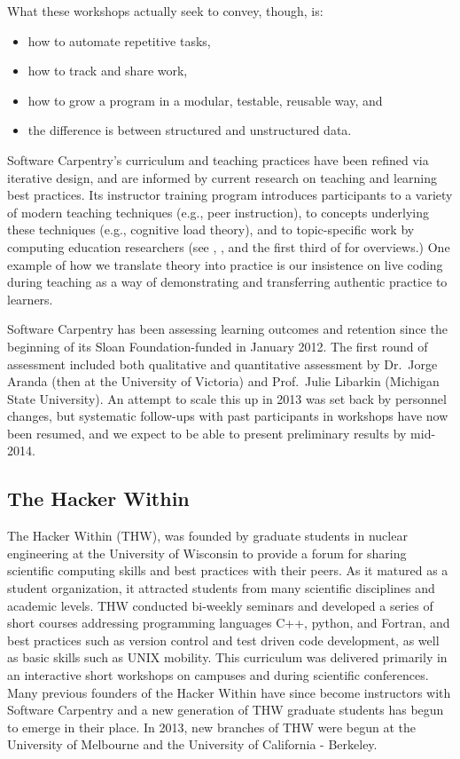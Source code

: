 \documentclass[11pt]{article}
\begin{document}
What these workshops actually seek to convey, though, is:

\begin{itemize}
\item
  how to automate repetitive tasks,
\item
  how to track and share work,
\item
  how to grow a program in a modular, testable, reusable way, and
\item
  the difference is between structured and unstructured data.
\end{itemize}

Software Carpentry's curriculum and teaching practices have been
refined via iterative design, and are informed by current research on
teaching and learning best practices.  Its instructor training program
introduces participants to a variety of modern teaching techniques
(e.g., peer instruction), to concepts underlying these techniques
(e.g., cognitive load theory), and to topic-specific work by computing
education researchers (see \cite{guzdial2010}, \cite{hazzan2011}, and
the first third of \cite{sorva2012} for overviews.)  One example of
how we translate theory into practice is our insistence on live coding
during teaching as a way of demonstrating and transferring authentic
practice to learners.

Software Carpentry has been assessing learning outcomes and retention
since the beginning of its Sloan Foundation-funded in January 2012.
The first round of assessment included both qualitative and
quantitative assessment by Dr.\ Jorge Aranda (then at the University
of Victoria) and Prof.\ Julie Libarkin (Michigan State University).
An attempt to scale this up in 2013 was set back by personnel changes,
but systematic follow-ups with past participants in workshops have now
been resumed, and we expect to be able to present preliminary results
by mid-2014.

\subsection{The Hacker Within}

The Hacker Within (THW)\cite{huff2010}, was founded by graduate students in 
nuclear engineering at the University of Wisconsin to provide a forum for 
sharing scientific computing skills and best practices with their peers. As it 
matured as a student organization, it attracted students from many scientific 
disciplines and academic levels. THW conducted bi-weekly seminars and developed 
a series of short courses addressing programming languages C++, python, and 
Fortran, and best practices such as version control and test driven code 
development, as well as basic skills such as UNIX mobility. This curriculum was 
delivered primarily in an interactive short workshops on campuses and during 
scientific conferences. Many previous founders of the Hacker Within have since 
become instructors with Software Carpentry and a new generation of THW graduate 
students has begun to emerge in their place. In 2013, new branches of THW were 
begun at the University of Melbourne and the University of California - 
Berkeley.  
\end{document}
